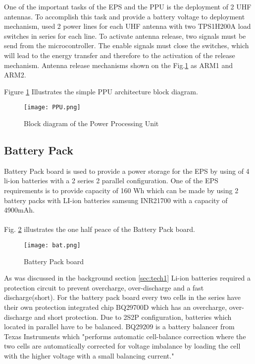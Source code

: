   One of the important tasks of the EPS and the PPU is the deployment of 2 UHF antennas. To accomplish this task and provide a battery voltage to deployment mechanism, used 2 power lines for each UHF antenna with two TPS1H200A load switches in series for each line. To activate antenna release, two signals must be send from the microcontroller. The enable signals must close the switches, which will lead to the energy transfer and therefore to the activation of the release mechanism. Antenna release mechanisms shown on the Fig.\ref{fig: PPU} as ARM1 and ARM2. 
  
  
  
  Figure \ref{fig: PPU} Illustrates the simple PPU architecture block diagram. 
  
  \begin{figure}[h]
  	\centering
  	\texttt{[image: PPU.png]}
  	\caption{Block diagram of the Power Processing Unit}
  	\label{fig: PPU}
  \end{figure}
  
     \subsection{Battery Pack}
  
 Battery Pack board is used to provide a power storage for the EPS by using of 4 li-ion batteries with a 2 series 2 parallel configuration. One of the EPS requirements is to provide capacity of 160 Wh which can be made by using 2 battery packs with LI-ion batteries samsung INR21700 with a capacity of 4900mAh.\\ \\
 
 Fig. \ref{fig: bat} illustrates the one half peace of the Battery Pack board.
 
 \begin{figure}[h]
 	\centering
 	\texttt{[image: bat.png]}
 	\caption{Battery Pack board}
 	\label{fig: bat}
 \end{figure}
 
  As was discussed in the background section \ref{sec:tech1} Li-ion batteries required a protection circuit to prevent overcharge, over-discharge and a fast discharge(short). For the battery pack board every two cells in the series have their own protection integrated chip BQ29700D which has an overcharge, over-discharge and short protection. Due to 2S2P configuration, batteries which located in parallel have to be balanced. BQ29209 is a battery balancer from Texas Instruments which \cite{23}"performs automatic cell-balance correction where the two cells are automatically corrected for voltage imbalance by loading the cell with the higher voltage with a small balancing current."  
  
